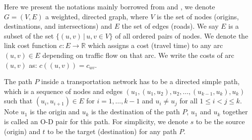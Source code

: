 \begin{comment}
\begin{figure}
    \centering
    \begin{tikzpicture}
        \begin{axis}
            [
                domain=0:10000,
                black, no markers, smooth,
                xmin=0,xmax=10000,
                ymin=0,ymax=130,
                axis x line=bottom,
                axis y line=left,
                xlabel={Traffic Flow},
                ylabel={Travel Time},
                every axis y label/.style={at={(current axis.above origin)},anchor=north east, xshift=-2pt},
                every axis x label/.style={at={(current axis.right of origin)},anchor=north west, xshift=-2pt},
                extra y ticks={20},
                extra y tick labels={Freeflow time},
                extra y tick style={overlay},
                xtick=\empty,
                ytick=\empty,
                xticklabel=\empty,
                yticklabel=\empty,
                scaled ticks=false
            ]
            \addplot [->, black] {20+0.15*(x/2000)^4}; 
        \end{axis}
    \end{tikzpicture}
    \caption{Travel time function.}
    \label{fig:flowfunction}
\end{figure}
\end{comment}

Here we present the notations mainly borrowed from \citet{Cormen} and \citet{Klunder},
we denote $ G = ( V, E ) $ a weighted, directed graph,
where $ V $ is the set of nodes (origins, destinations, and intersections)
and $ E $ the set of edges (roads).
We say $ E $ is a subset of the set $ \{ (u, v)\, | \, u, v \in V \} $ of all ordered pairs of nodes.
We denote the link cost function $ c : E \rightarrow \mathbb{R} $ which assigns a cost (travel time) to any arc $ (u,v) \in E $ depending on traffic flow on that arc.
We write the costs of arc $(u, v)$ as: $ c((u, v)) = c_{uv} $.

The path $P$ inside a transportation network has to be a directed simple path, 
which is a sequence of nodes and edges $ (u_1, (u_1, u_2), u_2, \ldots , (u_{k-1}, u_k), u_k ) $
such that $ (u_i, u_{i+1}) \in E$ for $i = 1,\ldots,k-1$ and $u_i \neq u_j$ for all $ 1 \leq i < j \leq k$.
Note $u_1$ is the origin and $u_k$ is the destination of the path $P$, $u_1$ and $u_k$ together is called an O-D pair for this path.
For simplicity, we denote $s$ to be the source (origin) and $t$ to be the target (destination) for any path $P$.

